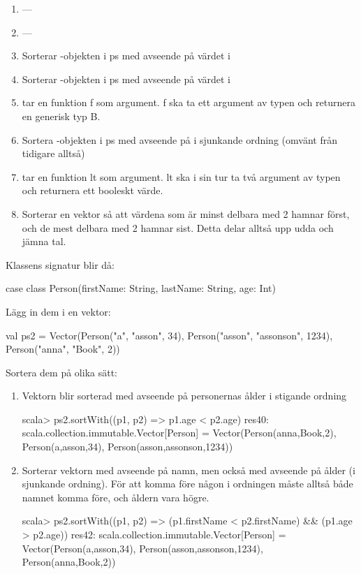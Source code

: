 \SubtaskSolved

\begin{enumerate}
\item ---
\item ---
\item Sorterar -objekten i ps med avseende på värdet i 
\item Sorterar -objekten i ps med avseende på värdet i 
\item {} tar en funktion f som argument. f ska ta ett argument av typen  och returnera en generisk typ B.
\item Sortera -objekten i ps med avseende på  i sjunkande ordning (omvänt från tidigare alltså)
\item {} tar en funktion lt som argument. lt ska i sin tur ta två argument av typen  och returnera ett booleskt värde.
\item Sorterar en vektor så att värdena som är minst delbara med 2 hamnar först, och de mest delbara med 2 hamnar sist. Detta delar alltså upp udda och jämna tal.
\end{enumerate}

\SubtaskSolved
Klassens signatur blir då:
\begin{REPLnonum}
case class Person(firstName: String, lastName: String, age: Int)
\end{REPLnonum}

Lägg in dem i en vektor:
\begin{REPLnonum}
val ps2 = Vector(Person("a", "asson", 34), Person("asson", "assonson", 1234),
Person("anna", "Book", 2))
\end{REPLnonum}

Sortera dem på olika sätt:
\begin{enumerate}
\item
Vektorn blir sorterad med avseende på personernas ålder i stigande ordning
\begin{REPLnonum}
scala> ps2.sortWith((p1, p2) => p1.age < p2.age)
res40: scala.collection.immutable.Vector[Person] = Vector(Person(anna,Book,2),
Person(a,asson,34), Person(asson,assonson,1234))
\end{REPLnonum}

\item
Sorterar vektorn med avseende på namn, men också med avseende på ålder (i sjunkande ordning). För att komma före någon i ordningen måste alltså både namnet komma före, och åldern vara högre.
\begin{REPLnonum}
scala> ps2.sortWith((p1, p2) => (p1.firstName < p2.firstName) &&
(p1.age > p2.age))
res42: scala.collection.immutable.Vector[Person] = Vector(Person(a,asson,34),
Person(asson,assonson,1234), Person(anna,Book,2))
\end{REPLnonum}
\end{enumerate}



\QUESTEND



